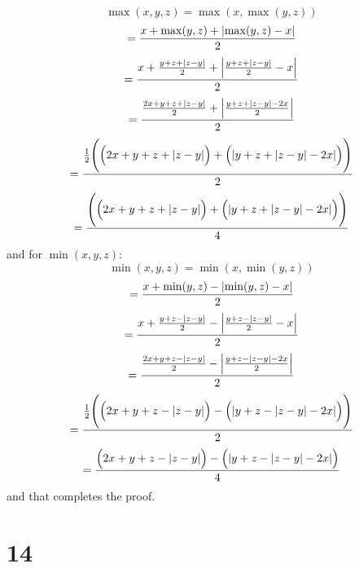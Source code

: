\documentclass{article}
\begin{document}
\begin{equation*}
	\max(x, y, z) = \max(x, \max(y, z))
\end{equation*}
\begin{equation*}
	= \frac{x + \max(y, z) + \abs{\max(y,z) - x} }{2}
\end{equation*}
\begin{equation*}
	= \frac{x + \frac{y + z + \abs{z - y}}{2} + \abs{\frac{y + z + \abs{z - y}}{2} - x} }{2}
\end{equation*}
\begin{equation*}
	= \frac{\frac{2x + y + z + \abs{z - y}}{2} + \abs{\frac{y + z + \abs{z - y} -2x}{2}} }{2}
\end{equation*}
\begin{equation*}
	= \frac{ \frac{1}{2} \Bigg( \Big(2x + y + z + \abs{z - y}\Big) + \Big(\abs{y + z + \abs{z - y} -2x}\Big)\Bigg)}{2}
\end{equation*}
\begin{equation*}
	= \frac{ \Bigg( \Big(2x + y + z + \abs{z - y}\Big) + \Big(\abs{y + z + \abs{z - y} -2x}\Big)\Bigg)}{4}
\end{equation*}
and for \(\min(x, y, z)\):
\begin{equation*}
	\min(x, y, z) = \min(x, \min(y, z))
\end{equation*}
\begin{equation*}
	= \frac{x + \min(y, z) - \abs{\min(y, z) - x}}{2}
\end{equation*}
\begin{equation*}
	= \frac{x + \frac{y + z - \abs{z - y}}{2} - \abs{\frac{y + z - \abs{z - y}}{2} - x}}{2}
\end{equation*}
\begin{equation*}
	= \frac{\frac{2x + y + z - \abs{z - y}}{2} - \abs{\frac{y + z - \abs{z - y} - 2x}{2}}}{2}
\end{equation*}
\begin{equation*}
	= \frac{\frac{1}{2}\Bigg( \Big(2x + y + z - \abs{z - y}\Big) - \Big(\abs{y + z - \abs{z - y} - 2x}\Big)\Bigg)}{2}  
\end{equation*}
\begin{equation*}
	= \frac{\Big(2x + y + z - \abs{z - y}\Big) - \Big(\abs{y + z - \abs{z - y} - 2x}\Big)}{4}  
\end{equation*}
and that completes the proof.


\section*{14}
\end{document}
